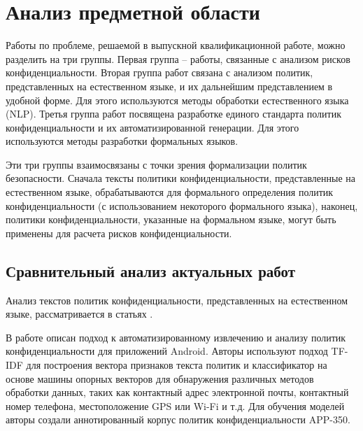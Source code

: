 \documentclass[../main]{subfiles}
\begin{document}
\newpage
\section{Анализ предметной области}
\label{sec:subject_domain}

Работы по проблеме, решаемой в выпускной квалификационной работе, можно разделить на три группы. Первая группа -- работы, связанные с анализом рисков конфиденциальности. Вторая группа работ связана с анализом политик, представленных на естественном языке, и их дальнейшим представлением в удобной форме. Для этого используются методы обработки естественного языка (NLP). Третья группа работ посвящена разработке единого стандарта политик конфиденциальности и их автоматизированной генерации. Для этого используются методы разработки формальных языков.

Эти три группы взаимосвязаны с точки зрения формализации политик безопасности. Сначала тексты политики конфиденциальности, представленные на естественном языке, обрабатываются для формального определения политик конфиденциальности (с использованием некоторого формального языка), наконец, политики конфиденциальности, указанные на формальном языке, могут быть применены для расчета рисков конфиденциальности.

\subsection{Сравнительный анализ актуальных работ}
Анализ текстов политик конфиденциальности, представленных на естественном языке, рассматривается в статьях \cite{MDPI5, MDPI6, MDPI9}.

В работе \cite{MDPI5} описан подход к автоматизированному извлечению и анализу политик конфиденциальности для приложений Android. Авторы используют подход TF-IDF для построения вектора признаков текста политик и классификатор на основе машины опорных векторов для обнаружения различных методов обработки данных, таких как контактный адрес электронной почты, контактный номер телефона, местоположение GPS или Wi-Fi и т.д. Для обучения моделей авторы создали аннотированный корпус политик конфиденциальности APP-350.
\end{document}
